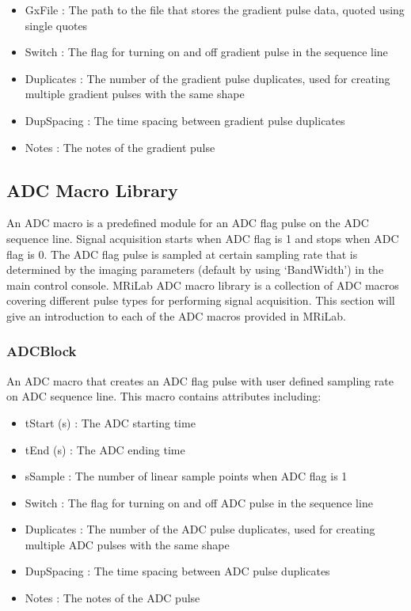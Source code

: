 \documentclass{book}%
\begin{document}
\begin{itemize}
	\item GxFile : The path to the file that stores the gradient pulse data, quoted using single quotes
	\item Switch : The flag for turning on and off gradient pulse in the sequence line
	\item Duplicates : The number of the gradient pulse duplicates, used for creating multiple gradient pulses with the same shape
	\item DupSpacing : The time spacing between gradient pulse duplicates
	\item Notes : The notes of the gradient pulse 
\end{itemize}


\subsection{ADC Macro Library}

An ADC macro is a predefined module for an ADC flag pulse on the ADC sequence line. Signal acquisition starts when ADC flag is 1 and stops when ADC flag is 0. The ADC flag pulse is sampled at certain sampling rate that is determined by the imaging parameters (default by using `BandWidth') in the main control console. MRiLab ADC macro library is a collection of ADC macros covering different pulse types for performing signal acquisition. This section will give an introduction to each of the ADC macros provided in MRiLab.

\subsubsection{ADCBlock}

An ADC macro that creates an ADC flag pulse with user defined sampling rate on ADC sequence line. This macro contains attributes including:

\begin{itemize}
	\item tStart (s) : The ADC starting time
	\item tEnd (s) : The ADC ending time
	\item sSample : The number of linear sample points when ADC flag is 1
	\item Switch : The flag for turning on and off ADC pulse in the sequence line
	\item Duplicates : The number of the ADC pulse duplicates, used for creating multiple ADC pulses with the same shape
	\item DupSpacing : The time spacing between ADC pulse duplicates
	\item Notes : The notes of the ADC pulse 
\end{itemize}
\end{document}
